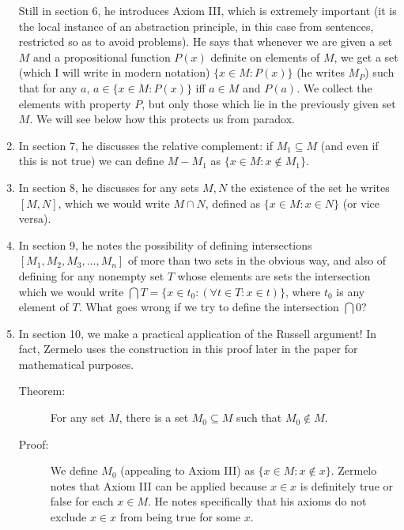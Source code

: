 \documentclass[12pt]{article}
\begin{document}
\begin{enumerate}
Still in section 6, he introduces Axiom III, which is extremely important (it is the local instance of an abstraction principle, in this case from sentences, restricted so as to avoid problems).
He says that whenever we are given a set $M$ and a propositional function $P(x)$ definite on elements of $M$, we get a set (which I will write in modern notation) $\{x \in M:P(x)\}$ (he writes $M_P$) such that \newline for any $a$, $a \in \{x \in M:P(x)\}$ iff $a \in M$ and $P(a)$.  We collect the elements with property $P$, but only those which lie in the previously given set $M$.  We will see below how this protects us from paradox.

\item  In section 7, he discusses the relative complement:  if $M_1 \subseteq M$ (and even if this is not true) we can define $M-M_1$ as $\{x \in M:x \not\in M_1\}$.

\item In section 8, he discusses for any sets $M,N$ the existence of the set he writes $[M,N]$, which we would write $M \cap N$, defined as $\{x \in M:x \in N\}$ (or vice versa).

\item In section 9, he notes the possibility of defining intersections $[M_1,M_2,M_3,\ldots,M_n]$ of more than two sets in the obvious way, and also of defining for any nonempty set
$T$ whose elements are sets the intersection which we would write $\bigcap T = \{x \in t_0:(\forall t \in T:x \in t)\}$, where $t_0$ is any element of $T$.  What goes wrong if we try
to define the intersection $\bigcap 0$?

\item In section 10, we make a practical application of the Russell argument!  In fact, Zermelo uses the construction in this proof later in the paper for mathematical purposes.

\begin{description}

\item[Theorem:]  For any set $M$, there is a set $M_0 \subseteq M$ such that $M_0 \not\in M$.

\item[Proof:]  We define $M_0$ (appealing to Axiom III) as $\{x \in M:x \not\in x\}$.  Zermelo notes that Axiom III can be applied because $x \in x$ is definitely true or false for
each $x \in M$.  He notes specifically that his axioms do not exclude $x \in x$ from being true for some $x$.


\end{description}
\end{enumerate}
\end{document}
